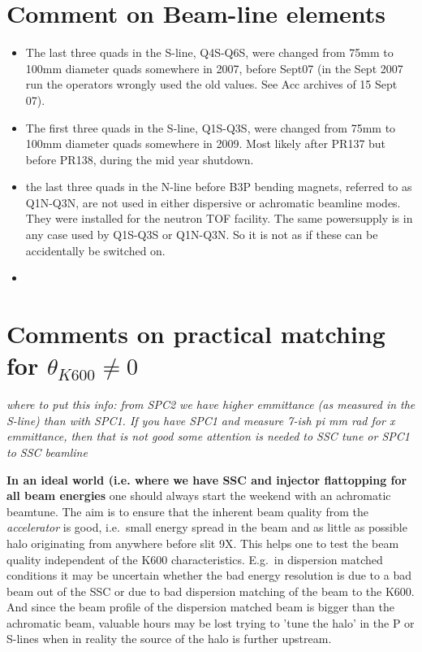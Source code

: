 \documentclass[11pt]{report}
\begin{document}
\section{Comment on Beam-line elements}

\begin{itemize}
\item The last three quads in the S-line, Q4S-Q6S, were changed from 75mm to 100mm diameter quads
somewhere in 2007, before Sept07
(in the Sept 2007 run the operators wrongly used the old values. See Acc archives of 15 Sept 07).
\item The first three quads in the S-line, Q1S-Q3S, were changed from 75mm to 100mm diameter quads
somewhere in 2009. Most likely after PR137 but before PR138,  during the mid year shutdown.
\item the last three quads in the N-line before B3P bending magnets, referred to as Q1N-Q3N,
are not used in either dispersive or achromatic beamline modes. They were installed for the
neutron TOF facility. The same powersupply is in any case used by Q1S-Q3S or Q1N-Q3N. So 
it is not as if these can be accidentally be switched on.
\item 
\end{itemize}




\section{Comments on practical matching for $\theta_{K600}\neq0$ }

{\it where to put this info: from SPC2 we have higher emmittance (as measured in the S-line)
than with SPC1. If you have SPC1 and measure 7-ish pi mm rad for x emmittance, then that is not good 
some attention is needed to SSC tune or SPC1 to SSC beamline}


{\bf In an ideal world (i.e. where we have SSC and injector flattopping for all beam energies}
one should always start the weekend with an achromatic beamtune.
The aim is to ensure that the inherent beam quality from the       
{\it accelerator} is good, i.e.~small energy spread in the beam      
and as little as possible halo originating from anywhere before slit 9X.      
This helps one to test the beam quality independent of the      
K600 characteristics. E.g.~in dispersion matched conditions it may be uncertain      
whether the bad energy resolution is due to a bad beam out of the       
SSC or due to bad dispersion matching of the beam to the K600.      
And since the beam profile of the dispersion matched beam is bigger than
the achromatic beam, valuable hours may be lost trying to 'tune the halo'      
in the P or S-lines when in reality the source of the halo is further upstream.
\end{document}
